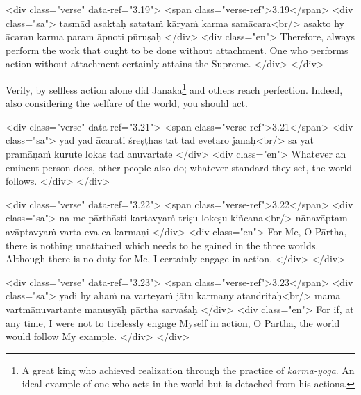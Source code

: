 \begin{html}
<div class="verse" data-ref="3.19">
  <span class="verse-ref">3.19</span>
  <div class="sa">
    tasmād asaktaḥ satataṁ kāryaṁ karma samācara<br/>
    asakto hy ācaran karma param āpnoti pūruṣaḥ
  </div>
  <div class="en">
    Therefore, always perform the work that ought to be done without attachment. One who performs action without attachment certainly attains the Supreme.
  </div>
</div>
\end{html}


{Verily, by selfless action alone did Janaka\footnote{A great king who achieved realization through the practice of \textit{karma-yoga}. An ideal example of one who acts in the world but is detached from his actions.} and others reach perfection. Indeed, also considering the welfare of the world, you should act.}


\begin{html}
<div class="verse" data-ref="3.21">
  <span class="verse-ref">3.21</span>
  <div class="sa">
    yad yad ācarati śreṣṭhas tat tad evetaro janaḥ<br/>
    sa yat pramāṇaṁ kurute lokas tad anuvartate
  </div>
  <div class="en">
    Whatever an eminent person does, other people also do; whatever standard they set, the world follows.
  </div>
</div>
\end{html}



\begin{html}
<div class="verse" data-ref="3.22">
  <span class="verse-ref">3.22</span>
  <div class="sa">
    na me pārthāsti kartavyaṁ triṣu lokeṣu kiñcana<br/>
    nānavāptam avāptavyaṁ varta eva ca karmaṇi
  </div>
  <div class="en">
    For Me, O Pārtha, there is nothing unattained which needs to be gained in the three worlds. Although there is no duty for Me, I certainly engage in action.
  </div>
</div>
\end{html}



\begin{html}
<div class="verse" data-ref="3.23">
  <span class="verse-ref">3.23</span>
  <div class="sa">
    yadi hy ahaṁ na varteyaṁ jātu karmaṇy atandritaḥ<br/>
    mama vartmānuvartante manuṣyāḥ pārtha sarvaśaḥ
  </div>
  <div class="en">
    For if, at any time, I were not to tirelessly engage Myself in action, O Pārtha, the world would follow My example.
  </div>
</div>
\end{html}



